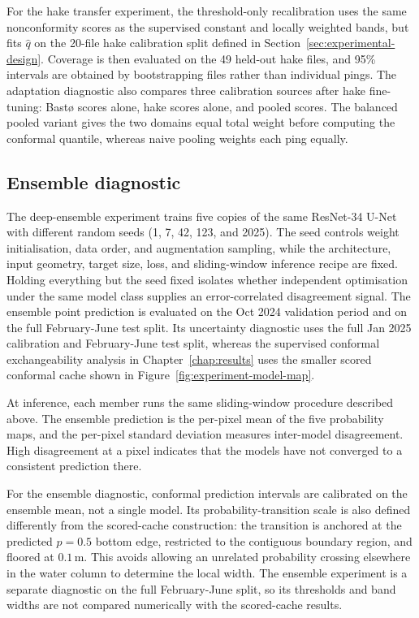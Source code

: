 For the hake transfer experiment, the threshold-only recalibration uses the same nonconformity scores as the supervised constant and locally weighted bands, but fits $\hat q$ on the 20-file hake calibration split defined in Section~\ref{sec:experimental-design}. Coverage is then evaluated on the 49 held-out hake files, and 95\% intervals are obtained by bootstrapping files rather than individual pings. The adaptation diagnostic also compares three calibration sources after hake fine-tuning: Bast\o{} scores alone, hake scores alone, and pooled scores. The balanced pooled variant gives the two domains equal total weight before computing the conformal quantile, whereas naive pooling weights each ping equally.

\subsection{Ensemble diagnostic}
\label{sec:ensemble-method}

The deep-ensemble experiment trains five copies of the same ResNet-34 U-Net with different random seeds (1, 7, 42, 123, and 2025). The seed controls weight initialisation, data order, and augmentation sampling, while the architecture, input geometry, target size, loss, and sliding-window inference recipe are fixed. Holding everything but the seed fixed isolates whether independent optimisation under the same model class supplies an error-correlated disagreement signal. The ensemble point prediction is evaluated on the Oct 2024 validation period and on the full February-June test split. Its uncertainty diagnostic uses the full Jan 2025 calibration and February-June test split, whereas the supervised conformal exchangeability analysis in Chapter~\ref{chap:results} uses the smaller scored conformal cache shown in Figure~\ref{fig:experiment-model-map}.

At inference, each member runs the same sliding-window procedure described above. The ensemble prediction is the per-pixel mean of the five probability maps, and the per-pixel standard deviation measures inter-model disagreement. High disagreement at a pixel indicates that the models have not converged to a consistent prediction there.

For the ensemble diagnostic, conformal prediction intervals are calibrated on the ensemble mean, not a single model. Its probability-transition scale is also defined differently from the scored-cache construction: the transition is anchored at the predicted $p=0.5$ bottom edge, restricted to the contiguous boundary region, and floored at $0.1$\,m. This avoids allowing an unrelated probability crossing elsewhere in the water column to determine the local width. The ensemble experiment is a separate diagnostic on the full February-June split, so its thresholds and band widths are not compared numerically with the scored-cache results.

